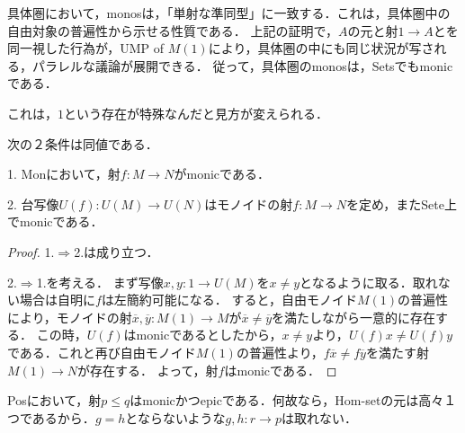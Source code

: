 \documentclass[uplatex, 12pt, dvipdfmx]{jsarticle}
\begin{document}
\begin{example}[具体圏に於けるmonic射は台写像もSets上でmonicである．]
    具体圏において，monosは，「単射な準同型」に一致する．これは，具体圏中の自由対象の普遍性から示せる性質である．
    上記の証明で，$A$の元と射$1\to A$とを同一視した行為が，UMP of $M(1)$により，具体圏の中にも同じ状況が写される，パラレルな議論が展開できる．
    従って，具体圏のmonosは，Setsでもmonicである．

    これは，$1$という存在が特殊なんだと見方が変えられる．
\end{example}

\begin{proposition*}次の２条件は同値である．

    1. Monにおいて，射$f:M\to N$がmonicである．
    
    2. 台写像$U(f):U(M)\to U(N)$はモノイドの射$f:M\to N$を定め，またSete上でmonicである．
\end{proposition*}
\begin{proof}
    1.$\Rightarrow$2.は成り立つ．

    2.$\Rightarrow$1.を考える．
    まず写像$x,y:1\to U(M)$を$x\ne y$となるように取る．取れない場合は自明に$f$は左簡約可能になる．
    すると，自由モノイド$M(1)$の普遍性により，モノイドの射$\overline{x},\overline{y}:M(1)\to M$が$\overline{x}\ne\overline{y}$を満たしながら一意的に存在する．
    この時，$U(f)$はmonicであるとしたから，$x\ne y$より，$U(f)x\ne U(f)y$である．これと再び自由モノイド$M(1)$の普遍性より，$f\overline{x}\ne f\overline{y}$を満たす射$M(1)\to N$が存在する．
    よって，射$f$はmonicである．
\end{proof}

\begin{example}
    Posにおいて，射$p\le q$はmonicかつepicである．何故なら，Hom-setの元は高々１つであるから．$g=h$とならないような$g,h:r\to p$は取れない．
\end{example}
\end{document}
